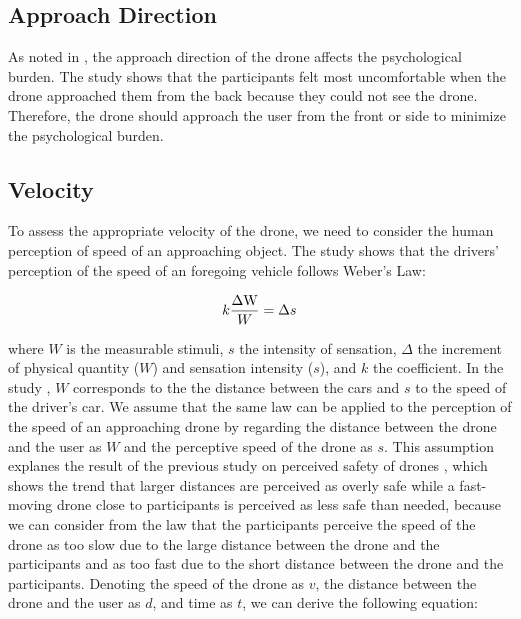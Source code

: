 \subsection{Approach Direction}

As noted in \cite{lieser2021evaluating-distances}, the approach direction of the drone affects the psychological burden.
The study shows that the participants felt most uncomfortable when the drone approached them from the back because they could not see the drone.
Therefore, the drone should approach the user from the front or side to minimize the psychological burden.


\subsection{Velocity}

To assess the appropriate velocity of the drone, we need to consider the human perception of speed of an approaching object.
The study \cite{Kolling2012weber-fechner-law} shows that the drivers' perception of the speed of an foregoing vehicle follows Weber's Law:

\begin{equation}
    k{\Delta {\rm W}\over W}=\Delta s
\end{equation}

where $W$ is the measurable stimuli, $s$ the intensity of sensation, $\Delta$ the increment of physical quantity ($W$) and sensation intensity ($s$), and $k$ the coefficient. 
In the study \cite{Kolling2012weber-fechner-law}, $W$ corresponds to the the distance between the cars and $s$ to the speed of the driver's car.
We assume that the same law can be applied to the perception of the speed of an approaching drone by regarding the distance between the drone and the user as $W$ and the perceptive speed of the drone as $s$.
This assumption explanes the result of the previous study on perceived safety of drones \cite{van2023perceived-safety}, 
which shows the trend that larger distances are perceived as overly safe while a fast-moving drone close to participants is perceived as less safe than needed,
because we can consider from the law that the participants perceive the speed of the drone as too slow due to the large distance between the drone and the participants and as too fast due to the short distance between the drone and the participants.
Denoting the speed of the drone as $v$, the distance between the drone and the user as $d$, and time as $t$, we can derive the following equation:

